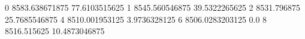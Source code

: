 0 8583.638671875 77.6103515625
1 8545.560546875 39.5322265625
2 8531.796875 25.7685546875
4 8510.001953125 3.9736328125
6 8506.0283203125 0.0
8 8516.515625 10.4873046875
